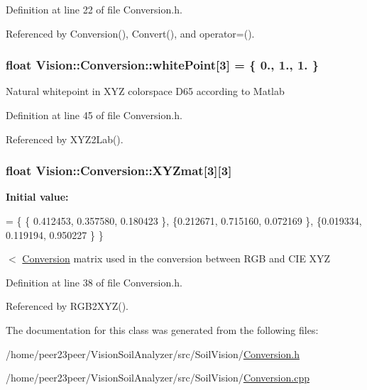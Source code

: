 Definition at line 22 of file Conversion.\+h.



Referenced by Conversion(), Convert(), and operator=().

\hypertarget{class_vision_1_1_conversion_adbaed406827f7ffb583d003815a9f3f8}{}
\subsubsection[{white\+Point}]{\setlength{\rightskip}{0pt plus 5cm}float Vision\+::\+Conversion\+::white\+Point\mbox{[}3\mbox{]} = \{ 0., 1., 1. \}\hspace{0.3cm}{\ttfamily [private]}}\label{class_vision_1_1_conversion_adbaed406827f7ffb583d003815a9f3f8}
Natural whitepoint in X\+Y\+Z colorspace D65 according to Matlab 

Definition at line 45 of file Conversion.\+h.



Referenced by X\+Y\+Z2\+Lab().

\hypertarget{class_vision_1_1_conversion_ad0c6e6c63380927c63da7f967b5e61d1}{}
\subsubsection[{X\+Y\+Zmat}]{\setlength{\rightskip}{0pt plus 5cm}float Vision\+::\+Conversion\+::\+X\+Y\+Zmat\mbox{[}3\mbox{]}\mbox{[}3\mbox{]}\hspace{0.3cm}{\ttfamily [private]}}\label{class_vision_1_1_conversion_ad0c6e6c63380927c63da7f967b5e61d1}
{\bfseries Initial value\+:}
\begin{DoxyCode}
=
        \{
            \{ 0.412453, 0.357580, 0.180423 \},
            \{0.212671, 0.715160, 0.072169 \},
            \{0.019334, 0.119194, 0.950227 \}
        \}
\end{DoxyCode}
$<$ \hyperlink{class_vision_1_1_conversion}{Conversion} matrix used in the conversion between R\+G\+B and C\+I\+E X\+Y\+Z 

Definition at line 38 of file Conversion.\+h.



Referenced by R\+G\+B2\+X\+Y\+Z().



The documentation for this class was generated from the following files\+:\begin{DoxyCompactItemize}
\item 
/home/peer23peer/\+Vision\+Soil\+Analyzer/src/\+Soil\+Vision/\hyperlink{_conversion_8h}{Conversion.\+h}\item 
/home/peer23peer/\+Vision\+Soil\+Analyzer/src/\+Soil\+Vision/\hyperlink{_conversion_8cpp}{Conversion.\+cpp}\end{DoxyCompactItemize}
